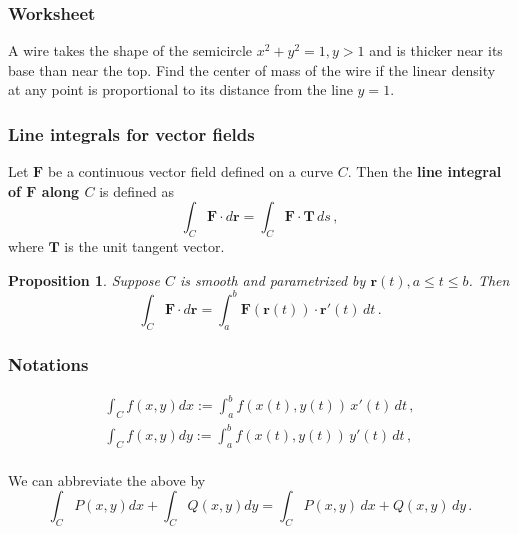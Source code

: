 \documentclass[aspectratio=169]{beamer}
\newtheorem*{proposition}{Proposition}
\begin{document}
\begin{frame}
    \frametitle{Worksheet}
    A wire takes the shape of the semicircle $x^2 + y^2 = 1, y>1$ and is thicker near its base than near the top. Find the center of mass of the wire if the linear density at any point is proportional to its distance from the line $y = 1$.
\end{frame}




\begin{frame}
    \frametitle{Line integrals for vector fields}
    \begin{definition}
    Let \(\mathbf{F}\) be a continuous vector field defined
    on a curve \(C\).
    Then the \textbf{line integral of \(\mathbf{F}\) along \(C\)} is defined as
    \begin{equation*}
        \int_C \mathbf{F} \cdot d \mathbf{r} 
        = \int_C \mathbf{F}\cdot \mathbf{T} \, ds \,,
    \end{equation*}
    where \(\mathbf{T}\) is the unit tangent vector.
    \end{definition}
\end{frame}


\begin{frame}
\begin{proposition}
Suppose \(C\) is smooth and
parametrized by \(\mathbf{r}(t), a \leq t \leq b\).
Then
\begin{equation*}
    \int_C \mathbf{F} \cdot d \mathbf{r} 
    = \int_a^b \mathbf{F}(\mathbf{r}(t)) \cdot \mathbf{r}'(t) \, dt\,.
\end{equation*}
\end{proposition}
\end{frame}

\begin{frame}
    \frametitle{Notations}
    \begin{align*}
    \int_C f(x,y) dx := \int_a^b f(x(t), y(t) ) \, x'(t) \, dt \,, \\
    \int_C f(x,y) dy := \int_a^b f(x(t), y(t) ) \, y'(t) \, dt \,, \\
    \end{align*}

    We can abbreviate the above by
    \begin{equation*}
    \int_C P(x,y) dx +
    \int_C Q(x,y) dy 
    = \int_C P(x,y) \, dx + Q(x,y) \, dy \,.
    \end{equation*}
\end{frame}
\end{document}

